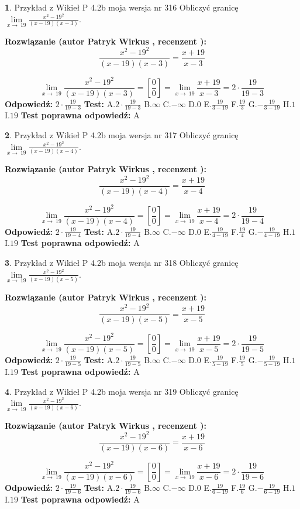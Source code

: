 \documentclass[12pt, a4paper]{article}
\theoremstyle{definition} %
\newtheorem{zad}{}
\newcommand{\zadStart}[1]{\begin{zad}#1\newline}
\newcommand{\zadStop}{\end{zad}}
\newcommand{\rozwStart}[2]{\noindent \textbf{Rozwiązanie (autor #1 , recenzent #2): }\newline}
\newcommand{\rozwStop}{\newline}
\newcommand{\odpStart}{\noindent \textbf{Odpowiedź:}\newline}
\newcommand{\odpStop}{\newline}
\newcommand{\testStart}{\noindent \textbf{Test:}\newline}
\newcommand{\testStop}{\newline}
\newcommand{\kluczStart}{\noindent \textbf{Test poprawna odpowiedź:}\newline}
\newcommand{\kluczStop}{\newline}
\begin{document}
\zadStart{Przykład z Wikieł P 4.2b moja wersja nr 316}
Obliczyć granicę $\lim\limits_{x\to\ 19}\frac{x^{2}-19^{2}}{(x-19)(x-3)}$.
\zadStop
\rozwStart{Patryk Wirkus}{}
$$\frac{x^{2}-19^{2}}{(x-19)(x-3)}=\frac{x+19}{x-3}$$

$$\lim\limits_{x\to\ 19}\frac{x^{2}-19^{2}}{(x-19)(x-3)}=[\frac{0}{0}]=\lim\limits_{x\to\ 19}\frac{x+19}{x-3}=2 \cdot \frac{19}{19-3}$$
\rozwStop
\odpStart
$2 \cdot \frac{19}{19-3}$
\odpStop
\testStart
A.$2 \cdot \frac{19}{19-3}$
B.$\infty$
C.$-\infty$
D.$0$
E.$\frac{19}{3-19}$
F.$\frac{19}{3}$
G.$-\frac{19}{3-19}$
H.$1$
I.$19$
\testStop
\kluczStart
A
\kluczStop



\zadStart{Przykład z Wikieł P 4.2b moja wersja nr 317}
Obliczyć granicę $\lim\limits_{x\to\ 19}\frac{x^{2}-19^{2}}{(x-19)(x-4)}$.
\zadStop
\rozwStart{Patryk Wirkus}{}
$$\frac{x^{2}-19^{2}}{(x-19)(x-4)}=\frac{x+19}{x-4}$$

$$\lim\limits_{x\to\ 19}\frac{x^{2}-19^{2}}{(x-19)(x-4)}=[\frac{0}{0}]=\lim\limits_{x\to\ 19}\frac{x+19}{x-4}=2 \cdot \frac{19}{19-4}$$
\rozwStop
\odpStart
$2 \cdot \frac{19}{19-4}$
\odpStop
\testStart
A.$2 \cdot \frac{19}{19-4}$
B.$\infty$
C.$-\infty$
D.$0$
E.$\frac{19}{4-19}$
F.$\frac{19}{4}$
G.$-\frac{19}{4-19}$
H.$1$
I.$19$
\testStop
\kluczStart
A
\kluczStop



\zadStart{Przykład z Wikieł P 4.2b moja wersja nr 318}
Obliczyć granicę $\lim\limits_{x\to\ 19}\frac{x^{2}-19^{2}}{(x-19)(x-5)}$.
\zadStop
\rozwStart{Patryk Wirkus}{}
$$\frac{x^{2}-19^{2}}{(x-19)(x-5)}=\frac{x+19}{x-5}$$

$$\lim\limits_{x\to\ 19}\frac{x^{2}-19^{2}}{(x-19)(x-5)}=[\frac{0}{0}]=\lim\limits_{x\to\ 19}\frac{x+19}{x-5}=2 \cdot \frac{19}{19-5}$$
\rozwStop
\odpStart
$2 \cdot \frac{19}{19-5}$
\odpStop
\testStart
A.$2 \cdot \frac{19}{19-5}$
B.$\infty$
C.$-\infty$
D.$0$
E.$\frac{19}{5-19}$
F.$\frac{19}{5}$
G.$-\frac{19}{5-19}$
H.$1$
I.$19$
\testStop
\kluczStart
A
\kluczStop



\zadStart{Przykład z Wikieł P 4.2b moja wersja nr 319}
Obliczyć granicę $\lim\limits_{x\to\ 19}\frac{x^{2}-19^{2}}{(x-19)(x-6)}$.
\zadStop
\rozwStart{Patryk Wirkus}{}
$$\frac{x^{2}-19^{2}}{(x-19)(x-6)}=\frac{x+19}{x-6}$$

$$\lim\limits_{x\to\ 19}\frac{x^{2}-19^{2}}{(x-19)(x-6)}=[\frac{0}{0}]=\lim\limits_{x\to\ 19}\frac{x+19}{x-6}=2 \cdot \frac{19}{19-6}$$
\rozwStop
\odpStart
$2 \cdot \frac{19}{19-6}$
\odpStop
\testStart
A.$2 \cdot \frac{19}{19-6}$
B.$\infty$
C.$-\infty$
D.$0$
E.$\frac{19}{6-19}$
F.$\frac{19}{6}$
G.$-\frac{19}{6-19}$
H.$1$
I.$19$
\testStop
\kluczStart
A
\kluczStop
\end{document}

